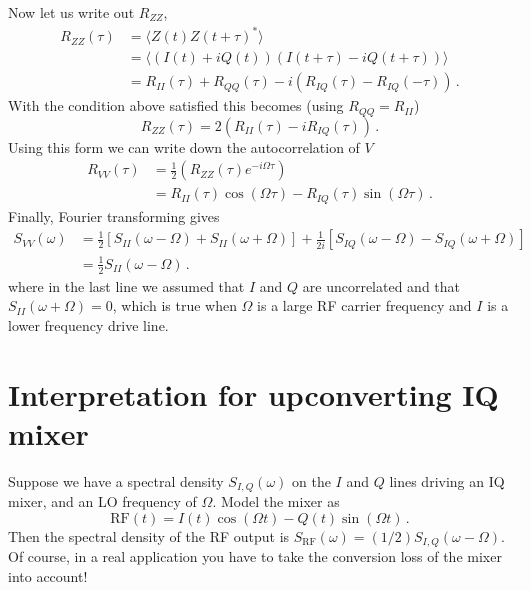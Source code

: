Now let us write out $R_{ZZ}$,
\begin{align}
R_{ZZ}(\tau)
&= \langle Z(t) Z(t+\tau)^* \rangle \\
&= \langle (I(t) + i Q(t))(I(t+\tau) - i Q(t+\tau)) \rangle \\
&= R_{II}(\tau) + R_{QQ}(\tau) - i \left( R_{IQ}(\tau) - R_{IQ}(-\tau) \right) \, .
\end{align}
With the condition above satisfied this becomes (using $R_{QQ} = R_{II}$)
\begin{equation}
R_{ZZ}(\tau) = 2 \left( R_{II}(\tau) - i R_{IQ}(\tau) \right) \, .
\end{equation}
Using this form we can write down the autocorrelation of $V$
\begin{align}
R_{VV}(\tau)
&= \frac{1}{2} \left( R_{ZZ}(\tau) e^{-i \Omega \tau} \right) \\
&= R_{II}(\tau) \cos(\Omega \tau) - R_{IQ}(\tau) \sin(\Omega \tau) \, . 
\end{align}
Finally, Fourier transforming gives
\begin{align}
S_{VV}(\omega) &=
\frac{1}{2} \left[ S_{II}(\omega - \Omega) + S_{II}(\omega + \Omega) \right]
+ \frac{1}{2i} \left[ S_{IQ}(\omega - \Omega) - S_{IQ}(\omega + \Omega) \right] \\
&= \frac{1}{2}S_{II}(\omega-\Omega) \, .
\end{align}
where in the last line we assumed that $I$ and $Q$ are uncorrelated and that $S_{II}(\omega + \Omega) = 0$, which is true when $\Omega$ is a large RF carrier frequency and $I$ is a lower frequency drive line.

\section{Interpretation for upconverting IQ mixer}

Suppose we have a spectral density $S_{I,Q}(\omega)$ on the $I$ and $Q$ lines driving an IQ mixer, and an LO frequency of $\Omega$.
Model the mixer as
\begin{equation}
\text{RF}(t) = I(t)\cos(\Omega t) - Q(t)\sin(\Omega t) \, .
\end{equation}
Then the spectral density of the RF output is $S_\text{RF}(\omega) = (1/2) S_{I,Q}(\omega - \Omega)$.
Of course, in a real application you have to take the conversion loss of the mixer into account!

